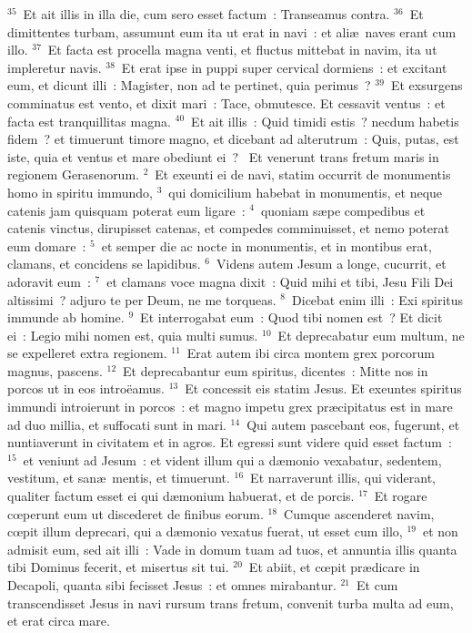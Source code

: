 ${}^{35}$~Et ait illis in illa die, cum sero esset factum~: Transeamus contra.
${}^{36}$~Et dimittentes turbam, assumunt eum ita ut erat in navi~: et ali\ae\ naves erant cum illo.
${}^{37}$~Et facta est procella magna venti, et fluctus mittebat in navim, ita ut impleretur navis.
${}^{38}$~Et erat ipse in puppi super cervical dormiens~: et excitant eum, et dicunt illi~: Magister, non ad te pertinet, quia perimus~?
${}^{39}$~Et exsurgens comminatus est vento, et dixit mari~: Tace, obmutesce. Et cessavit ventus~: et facta est tranquillitas magna.
${}^{40}$~Et ait illis~: Quid timidi estis~? necdum habetis fidem~? et timuerunt timore magno, et dicebant ad alterutrum~: Quis, putas, est iste, quia et ventus et mare obediunt ei~?
~\lettrine[lines=10,image=true,loversize=0.05,lraise=-0.03]{E}{}t venerunt trans fretum maris in regionem Gerasenorum.
${}^{2}$~Et exeunti ei de navi, statim occurrit de monumentis homo in spiritu immundo,
${}^{3}$~qui domicilium habebat in monumentis, et neque catenis jam quisquam poterat eum ligare~:
${}^{4}$~quoniam s\ae pe compedibus et catenis vinctus, dirupisset catenas, et compedes comminuisset, et nemo poterat eum domare~:
${}^{5}$~et semper die ac nocte in monumentis, et in montibus erat, clamans, et concidens se lapidibus.
${}^{6}$~Videns autem Jesum a longe, cucurrit, et adoravit eum~:
${}^{7}$~et clamans voce magna dixit~: Quid mihi et tibi, Jesu Fili Dei altissimi~? adjuro te per Deum, ne me torqueas.
${}^{8}$~Dicebat enim illi~: Exi spiritus immunde ab homine.
${}^{9}$~Et interrogabat eum~: Quod tibi nomen est~? Et dicit ei~: Legio mihi nomen est, quia multi sumus.
${}^{10}$~Et deprecabatur eum multum, ne se expelleret extra regionem.
${}^{11}$~Erat autem ibi circa montem grex porcorum magnus, pascens.
${}^{12}$~Et deprecabantur eum spiritus, dicentes~: Mitte nos in porcos ut in eos intro\"eamus.
${}^{13}$~Et concessit eis statim Jesus. Et exeuntes spiritus immundi introierunt in porcos~: et magno impetu grex pr\ae cipitatus est in mare ad duo millia, et suffocati sunt in mari.
${}^{14}$~Qui autem pascebant eos, fugerunt, et nuntiaverunt in civitatem et in agros. Et egressi sunt videre quid esset factum~:
${}^{15}$~et veniunt ad Jesum~: et vident illum qui a d\ae monio vexabatur, sedentem, vestitum, et san\ae\ mentis, et timuerunt.
${}^{16}$~Et narraverunt illis, qui viderant, qualiter factum esset ei qui d\ae monium habuerat, et de porcis.
${}^{17}$~Et rogare cœperunt eum ut discederet de finibus eorum.
${}^{18}$~Cumque ascenderet navim, cœpit illum deprecari, qui a d\ae monio vexatus fuerat, ut esset cum illo,
${}^{19}$~et non admisit eum, sed ait illi~: Vade in domum tuam ad tuos, et annuntia illis quanta tibi Dominus fecerit, et misertus sit tui.
${}^{20}$~Et abiit, et cœpit pr\ae dicare in Decapoli, quanta sibi fecisset Jesus~: et omnes mirabantur.
${}^{21}$~Et cum transcendisset Jesus in navi rursum trans fretum, convenit turba multa ad eum, et erat circa mare.


